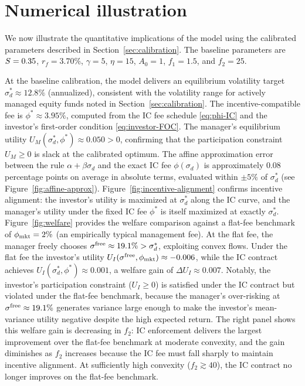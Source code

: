 \section{Numerical illustration}
\label{sec:numerical}

We now illustrate the quantitative implications of the model using the calibrated parameters described in Section~\ref{sec:calibration}. The baseline parameters are $S=0.35$, $r_f=3.70\%$, $\gamma=5$, $\eta=15$, $A_0=1$, $f_1=1.5$, and $f_2=25$.

At the baseline calibration, the model delivers an equilibrium volatility target $\sigma_d^* \approx 12.8\%$ (annualized), consistent with the volatility range for actively managed equity funds noted in Section~\ref{sec:calibration}. The incentive-compatible fee is $\phi^* \approx 3.95\%$, computed from the IC fee schedule \eqref{eq:phi-IC} and the investor's first-order condition \eqref{eq:investor-FOC}. The manager's equilibrium utility $U_M(\sigma_d^*, \phi^*) \approx 0.050 > 0$, confirming that the participation constraint $U_M \ge 0$ is slack at the calibrated optimum. The affine approximation error between the rule $\alpha + \beta\sigma_d$ and the exact IC fee $\phi(\sigma_d)$ is approximately 0.08 percentage points on average in absolute terms, evaluated within $\pm 5\%$ of $\sigma_d^*$ (see Figure~\ref{fig:affine-approx}). Figure~\ref{fig:incentive-alignment} confirms incentive alignment: the investor's utility is maximized at $\sigma_d^*$ along the IC curve, and the manager's utility under the fixed IC fee $\phi^*$ is itself maximized at exactly $\sigma_d^*$. Figure~\ref{fig:welfare} provides the welfare comparison against a flat-fee benchmark of $\phi_{\rm mkt}=2\%$ (an empirically typical management fee). At the flat fee, the manager freely chooses $\sigma^{\rm free}\approx 19.1\%>\sigma_d^*$, exploiting convex flows. Under the flat fee the investor's utility $U_I(\sigma^{\rm free},\phi_{\rm mkt})\approx -0.006$, while the IC contract achieves $U_I(\sigma_d^*,\phi^*)\approx 0.001$, a welfare gain of $\Delta U_I\approx 0.007$. Notably, the investor's participation constraint ($U_I\ge 0$) is satisfied under the IC contract but violated under the flat-fee benchmark, because the manager's over-risking at $\sigma^{\rm free}\approx 19.1\%$ generates variance large enough to make the investor's mean-variance utility negative despite the high expected return. The right panel shows this welfare gain is decreasing in $f_2$: IC enforcement delivers the largest improvement over the flat-fee benchmark at moderate convexity, and the gain diminishes as $f_2$ increases because the IC fee must fall sharply to maintain incentive alignment. At sufficiently high convexity ($f_2\gtrsim 40$), the IC contract no longer improves on the flat-fee benchmark.

